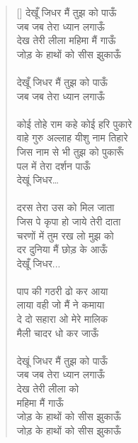 \begin{verse}[\versewidth]\texthindi{
देखूँ जिधर मैं तुझ को पाऊँ\\
जब जब तेरा ध्यान लगाऊँ\\
देख तेरी लीला महिमा मैं गाऊँ\\
जोड़ के हाथों को सीस झुकाऊँ\\
\\
देखूँ जिधर मैं तुझ को पाऊँ\\
जब जब तेरा ध्यान लगाऊँ\\
\\
कोई तोहे राम कहे कोई हरि पुकारे\\
वाहे गुरु अल्लाह यीशु नाम तिहारे\\
जिस नाम से भी तुझ को पुकारूँ\\
पल में तेरा दर्शन पाऊँ\\
देखूं जिधर…\\
\\
दरस तेरा उस को मिल जाता\\
जिस पे कृपा हो जाये तेरी दाता\\
चरणों में तुम रख लो मुझ को\\
दर दुनिया मैं छोड़ के आऊँ\\
देखूँ जिधर...\\
\\
पाप की गठरी ढो कर आया\\
लाया वही जो मैं ने कमाया\\
दे दो सहारा ओ मेरे मालिक\\
मैली चादर धो कर जाऊँ\\
\\
देखूं जिधर मैं तुझ को पाऊँ\\
जब जब तेरा ध्यान लगाऊँ\\
देख तेरी लीला को\\
महिमा मैं गाऊँ\\
जोड़ के हाथों को सीस झुकाऊँ \\
जोड़ के हाथों को सीस झुकाऊँ
}
\end{verse}


